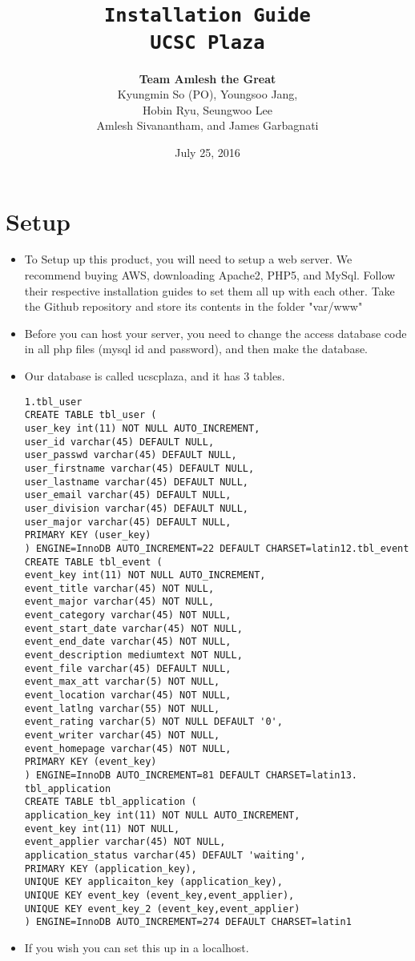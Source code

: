 \documentclass[10pt]{article}
\title{\color{primary}\texttt{Installation Guide \\ UCSC Plaza}}
\author{{\color{secondary}\textbf{Team Amlesh the Great}} \\ Kyungmin So (PO), Youngsoo Jang, \\ Hobin Ryu, Seungwoo Lee \\ Amlesh Sivanantham, and James Garbagnati }
\date{July 25, 2016}
\newcommand{\fancysec}[2] {{\color{primary}\section{#1} \label{sec:#2}}}
\begin{document}
	
	\maketitle
	
	\fancysec{Setup}{setup}
		\begin{itemize}
			\item To Setup up this product, you will need to setup a web server. We recommend buying AWS, downloading Apache2, PHP5, and MySql. Follow their respective installation guides to set them all up with each other. Take the Github repository and store its contents in the folder "var/www"
			\item Before you can host your server, you need to change the access database code in all php files (mysql id and password), and then make the database.
			\item Our database is called ucscplaza, and it has 3 tables.
			\begin{lstlisting}[frame = single]
1.tbl_user
CREATE TABLE tbl_user (
user_key int(11) NOT NULL AUTO_INCREMENT,
user_id varchar(45) DEFAULT NULL,
user_passwd varchar(45) DEFAULT NULL,
user_firstname varchar(45) DEFAULT NULL,
user_lastname varchar(45) DEFAULT NULL,
user_email varchar(45) DEFAULT NULL,
user_division varchar(45) DEFAULT NULL,
user_major varchar(45) DEFAULT NULL,
PRIMARY KEY (user_key)
) ENGINE=InnoDB AUTO_INCREMENT=22 DEFAULT CHARSET=latin12.tbl_event
CREATE TABLE tbl_event (
event_key int(11) NOT NULL AUTO_INCREMENT,
event_title varchar(45) NOT NULL,
event_major varchar(45) NOT NULL,
event_category varchar(45) NOT NULL,
event_start_date varchar(45) NOT NULL,
event_end_date varchar(45) NOT NULL,
event_description mediumtext NOT NULL,
event_file varchar(45) DEFAULT NULL,
event_max_att varchar(5) NOT NULL,
event_location varchar(45) NOT NULL,
event_latlng varchar(55) NOT NULL,
event_rating varchar(5) NOT NULL DEFAULT '0',
event_writer varchar(45) NOT NULL,
event_homepage varchar(45) NOT NULL,
PRIMARY KEY (event_key)
) ENGINE=InnoDB AUTO_INCREMENT=81 DEFAULT CHARSET=latin13.
tbl_application
CREATE TABLE tbl_application (
application_key int(11) NOT NULL AUTO_INCREMENT,
event_key int(11) NOT NULL,
event_applier varchar(45) NOT NULL,
application_status varchar(45) DEFAULT 'waiting',
PRIMARY KEY (application_key),
UNIQUE KEY applicaiton_key (application_key),
UNIQUE KEY event_key (event_key,event_applier),
UNIQUE KEY event_key_2 (event_key,event_applier)
) ENGINE=InnoDB AUTO_INCREMENT=274 DEFAULT CHARSET=latin1
			\end{lstlisting}
			\item If you wish you can set this up in a localhost.
			
		\end{itemize}

	
\end{document}
